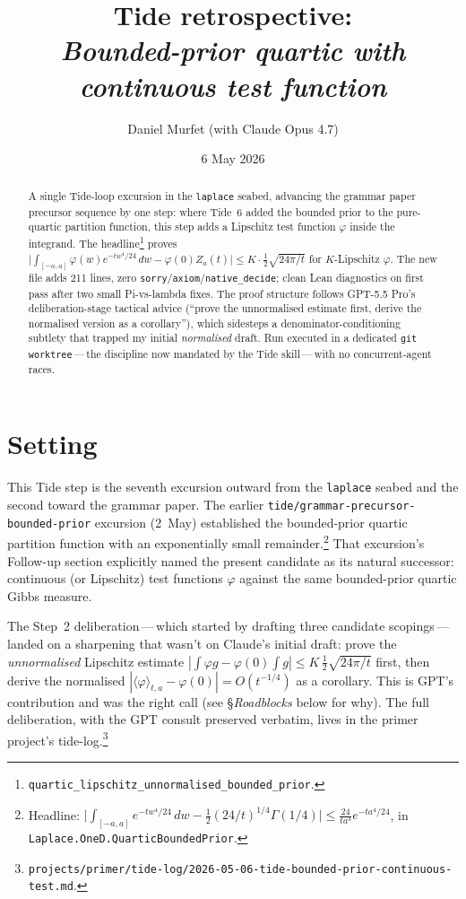 \documentclass[11pt]{article}
\title{Tide retrospective:\\\emph{Bounded-prior quartic with continuous test function}}
\author{Daniel Murfet (with Claude Opus 4.7)}
\date{6 May 2026}
\begin{document}
\maketitle

\begin{abstract}
A single Tide-loop excursion in the \texttt{laplace} seabed, advancing the
grammar paper precursor sequence by one step: where Tide~6 added the bounded
prior to the pure-quartic partition function, this step adds a Lipschitz
test function $\varphi$ inside the integrand. The
headline\footnote{\texttt{quartic\_lipschitz\_unnormalised\_bounded\_prior}.}
proves $\big|\int_{[-a,a]} \varphi(w)e^{-tw^4/24}\,dw - \varphi(0) Z_a(t)\big|
\le K \cdot \tfrac{1}{2}\sqrt{24\pi/t}$ for $K$-Lipschitz $\varphi$. The new
file adds 211 lines, zero
\texttt{sorry}/\texttt{axiom}/\texttt{native\_decide}; clean Lean
diagnostics on first pass after two small Pi-vs-lambda fixes. The proof
structure follows GPT-5.5 Pro's deliberation-stage tactical advice
(``prove the unnormalised estimate first, derive the normalised version as a
corollary''), which sidesteps a denominator-conditioning subtlety that
trapped my initial \emph{normalised} draft. Run executed in a dedicated
\texttt{git worktree}\,---\,the discipline now mandated by the Tide
skill\,---\,with no concurrent-agent races.
\end{abstract}

\section{Setting}

This Tide step is the seventh excursion outward from the \texttt{laplace}
seabed and the second toward the grammar paper. The earlier
\texttt{tide/grammar-precursor-bounded-prior} excursion (2~May) established
the bounded-prior quartic partition function with an exponentially small
remainder.\footnote{Headline:
$\big|\int_{[-a,a]} e^{-tw^4/24}\,dw - \tfrac{1}{2}(24/t)^{1/4}\Gamma(1/4)\big|
\le \tfrac{24}{ta^3} e^{-ta^4/24}$, in
\texttt{Laplace.OneD.QuarticBoundedPrior}.}
That excursion's Follow-up section explicitly named the present candidate as
its natural successor: continuous (or Lipschitz) test functions $\varphi$
against the same bounded-prior quartic Gibbs measure.

The Step~2 deliberation\,---\,which started by drafting three candidate
scopings\,---\,landed on a sharpening that wasn't on Claude's initial draft:
prove the \emph{unnormalised} Lipschitz estimate
$|{\int \varphi g - \varphi(0)\!\int g}| \le K\,\tfrac{1}{2}\sqrt{24\pi/t}$
first, then derive the normalised
$|\langle\varphi\rangle_{t,a} - \varphi(0)| = O(t^{-1/4})$ as a corollary.
This is GPT's contribution and was the right call (see \S\emph{Roadblocks}
below for why). The full deliberation, with the GPT consult preserved
verbatim, lives in the primer project's
tide-log.\footnote{\texttt{projects/primer/tide-log/}\allowbreak\texttt{2026-05-06-tide-bounded-prior-continuous-test.md}.}
\end{document}
